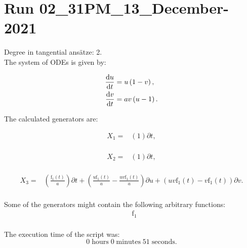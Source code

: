 \section*{Run 02\_31PM\_13\_December-2021}
Degree in tangential ansätze:	2.\\
The system of ODEs is given by:

\begin{align*}
\dv{u}{t}&=u \left(1 - v\right),\\
\dv{v}{t}&=a v \left(u - 1\right).\\
\end{align*}

\noindent The calculated generators are:

\begin{align*}
X_{1}=&\left(1 \right)\partial t,\\
\end{align*}

\begin{align*}
X_{2}=&\left(1 \right)\partial t,\\
\end{align*}

\begin{align*}
X_{3}=&\left(\frac{\operatorname{f_{1}}{\left(t \right)}}{a} \right)\partial t+\left(\frac{u \operatorname{f_{1}}{\left(t \right)}}{a}- \frac{u v \operatorname{f_{1}}{\left(t \right)}}{a} \right)\partial u+\left(u v \operatorname{f_{1}}{\left(t \right)} - v \operatorname{f_{1}}{\left(t \right)} \right)\partial v.\\
\end{align*}



\noindent Some of the generators might contain the following arbitrary functions:
\begin{align*}
&\operatorname{f_{1}}\\
\end{align*}

\noindent The execution time of the script was:
$$0\;\mathrm{hours}\;0\;\mathrm{minutes}\;51 \;\mathrm{seconds}.$$
